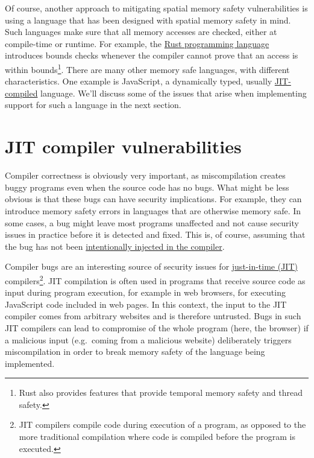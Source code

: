 \documentclass[a4paper,]{report}
\begin{document}
Of course, another approach to mitigating spatial memory safety
vulnerabilities is using a language that has been designed with spatial
memory safety in mind. Such languages make sure that all memory accesses
are checked, either at compile-time or runtime. For example, the
\href{https://www.rust-lang.org/}{Rust programming language} introduces
bounds checks whenever the compiler cannot prove that an access is
within bounds\footnote{Rust also provides features that provide temporal
  memory safety and thread safety.}. There are many other memory safe
languages, with different characteristics. One example is JavaScript, a
dynamically typed, usually
\protect\hyperlink{jit-compiler-vulnerabilities}{JIT-compiled} language.
We'll discuss some of the issues that arise when implementing support
for such a language in the next section.

\hypertarget{jit-compiler-vulnerabilities}{%
\section{JIT compiler
vulnerabilities}\label{jit-compiler-vulnerabilities}}

Compiler correctness is obviously very important, as miscompilation
creates buggy programs even when the source code has no bugs. What might
be less obvious is that these bugs can have security implications. For
example, they can introduce memory safety errors in languages that are
otherwise memory safe. In some cases, a bug might leave most programs
unaffected and not cause security issues in practice before it is
detected and fixed. This is, of course, assuming that the bug has not
been \protect\hyperlink{supply-chain-attacks}{intentionally injected in
the compiler}.

Compiler bugs are an interesting source of security issues for
\href{https://en.wikipedia.org/wiki/Just-in-time_compilation}{just-in-time
(JIT)} compilers\footnote{JIT compilers compile
  code during execution of a program, as opposed to the more traditional
  compilation where code is compiled before the program is executed.}.
JIT compilation is often used in programs that receive source code as
input during program execution, for example in web browsers, for
executing JavaScript code included in web pages. In this context, the
input to the JIT compiler comes from arbitrary websites and is therefore
untrusted. Bugs in such JIT compilers can lead to compromise of the
whole program (here, the browser) if a malicious input (e.g.~coming from
a malicious website) deliberately triggers miscompilation in order to
break memory safety of the language being implemented.
\end{document}
